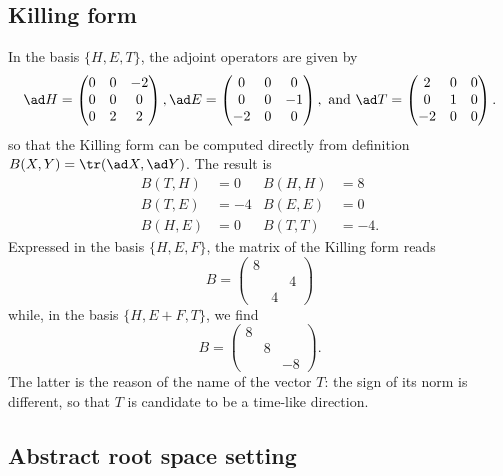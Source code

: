 \subsection{Killing form}

In the basis $\{ H,E,T \}$, the adjoint operators are given by
\[
\ad H=\begin{pmatrix}
 0 & 0 &-2 \\
 0 & 0 &0 \\ 
 0 & 2 &2
\end{pmatrix},
\ad E=\begin{pmatrix}
 0 & 0 &0 \\
 0 & 0 &-1\\ 
-2 & 0&0
\end{pmatrix},\textrm{ and }
  \ad T=\begin{pmatrix}
 2 & 0 &0 \\
0 & 1 &0\\
-2 & 0&0
\end{pmatrix}.
\]
so that the Killing form can be computed directly from definition $B(X,Y)=\tr(\ad X,\ad Y)$. The result is
\begin{subequations}
\begin{align}
B(T,H)&=0  & B(H,H)&=8\\
B(T,E)&=-4 & B(E,E)&=0\\
B(H,E)&=0  &  B(T,T)&=-4.
\end{align}
\end{subequations}
Expressed in the basis $\{H,E,F\}$, the matrix of the Killing form reads
\begin{equation}
B=
\begin{pmatrix}
8&&\\
&&4\\
&4&
\end{pmatrix}
\end{equation} 
while, in the basis  $\{H,E+F,T\}$, we find
\begin{equation}   \label{EqBHEFTsldR}
B=
\begin{pmatrix}
8\\
&8\\
&&-8
\end{pmatrix}.
\end{equation}
The latter is the reason of the name of the vector $T$: the sign of its norm is different, so that $T$ is candidate to be a time-like direction.

\subsection{Abstract root space setting}

